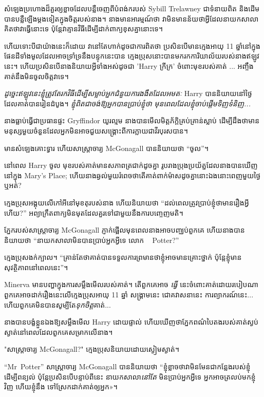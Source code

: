 សំឡេង​ប្រហោង​ដ៏​គួរ​ឲ្យ​ខ្លាច​ដែល​បន្លឺ​ចេញ​ពី​បំពង់ក​របស់ Sybill Trelawney ជា​ទំនាយ​ពិត និង​ដើម​បាន​បន្លឺ​ឡើង​ម្ដង​ទៀត​ក្នុង​ចិត្ត​របស់​នាង។ នាង​មាន​អារម្មណ៍​ថា វា​មិន​មាន​ន័យ​ថា​អ្វី​ដែល​នាយក​សាលា​គិត​ថា​វា​ធ្វើ​នោះ​ទេ ប៉ុន្តែ​វា​គ្មាន​វិធី​ដើម្បី​ដាក់​ពាក្យ​ខុស​គ្នា​នោះ​ទេ។

ហើយទោះបីជាយ៉ាងនេះក៏ដោយ វានៅតែហាក់ដូចជាការពិតថា ប្រសិនបើមានក្មេងអាយុ 11 ឆ្នាំនៅក្នុងផែនដីទាំងមូលដែលអាចទ្រាំទ្រនឹងបន្ទុកនេះបាន ក្មេងប្រុសនោះបានមករកការិយាល័យរបស់នាងឥឡូវនេះ។ ហើយប្រសិនបើនាងនិយាយអ្វីទាំងអស់ដូចជា 'Harry ក្រីក្រ' ចំពោះមុខរបស់គាត់ ... អញ្ចឹងគាត់នឹងមិនចូលចិត្តវាទេ។

\emph{ដូច្នេះឥឡូវនេះខ្ញុំត្រូវតែរកវិធីដើម្បីសម្លាប់អ្នកជំនួយការងងឹតដែលអមតៈ} Harry បាននិយាយនៅថ្ងៃដែលគាត់បានរៀនដំបូង។ \emph{ខ្ញុំពិតជាចង់ឱ្យអ្នកបានប្រាប់ខ្ញុំថា មុនពេលដែលខ្ញុំចាប់ផ្តើមទិញទំនិញ...}

នាងធ្លាប់ធ្វើជាប្រធានផ្ទះ Gryffindor យូរល្មម នាងបានមើលមិត្តភ័ក្តិគ្រប់គ្រាន់ស្លាប់ ដើម្បីដឹងថាមានមនុស្សមួយចំនួនដែលអ្នកមិនអាចជួយសង្គ្រោះពីការក្លាយជាវីរបុរសបាន។

មាន​សំឡេង​គោះ​ទ្វារ ហើយ​សាស្ត្រាចារ្យ McGonagall បាន​និយាយ​ថា “ចូល”។

នៅពេល Harry ចូល មុខរបស់គាត់មានសភាពត្រជាក់ដូចគ្នា រូបរាងប្រុងប្រយ័ត្នដែលនាងបានឃើញនៅក្នុង Mary's Place; ហើយ​នាង​ឆ្ងល់​មួយ​រំពេច​ថា​តើ​គាត់​ពាក់​ម៉ាស​ដូចគ្នា​នោះ​ឯង​នោះ​ពេញ​មួយ​ថ្ងៃ​ឬ​អត់?

ក្មេង​ប្រុស​អង្គុយ​លើ​កៅអី​នៅ​មុខ​តុ​របស់​នាង ហើយ​និយាយ​ថា “ដល់​ពេល​ត្រូវ​ប្រាប់​ខ្ញុំ​ថា​មាន​រឿង​អ្វី​ហើយ?” អព្យាក្រឹត​ពាក្យ​មិន​មុត​ដែល​គួរ​ទៅ​ជាមួយ​នឹង​ការ​បញ្ចេញ​មតិ។

ភ្នែក​របស់​សាស្ត្រាចារ្យ McGonagall ភ្ញាក់​ផ្អើល​មុន​ពេល​នាង​អាច​បញ្ឈប់​ពួក​គេ ហើយ​នាង​បាន​និយាយ​ថា “នាយក​សាលា​មិន​បាន​ប្រាប់​អ្នក​អ្វី​ទេ លោក ~ Potter?”

ក្មេងប្រុសងក់ក្បាល។ “គ្រាន់តែថាគាត់បានទទួលការព្រមានថាខ្ញុំអាចមានគ្រោះថ្នាក់ ប៉ុន្តែខ្ញុំមានសុវត្ថិភាពនៅពេលនេះ”។

Minerva មានបញ្ហាក្នុងការសម្លឹងមើលរបស់គាត់។ តើពួកគេអាច \emph{ធ្វើ} នេះចំពោះគាត់ដោយរបៀបណា ពួកគេអាចដាក់រឿងនេះលើក្មេងប្រុសអាយុ 11 ឆ្នាំ សង្គ្រាមនេះ ជោគវាសនានេះ ការព្យាករណ៍នេះ... ហើយពួកគេមិនបានសូម្បីតែ\emph{ទុកចិត្ត}គាត់...

នាងបានបង្ខំខ្លួនឯងឱ្យសម្លឹងមើល Harry ដោយផ្ទាល់ ហើយឃើញថាភ្នែកពណ៌បៃតងរបស់គាត់ស្ងប់ស្ងាត់នៅពេលដែលពួកគេសម្រាកលើនាង។

"សាស្រ្តាចារ្យ McGonagall?" ក្មេងប្រុសនិយាយដោយស្ងៀមស្ងាត់។

“Mr~Potter” សាស្ត្រាចារ្យ McGonagall បាននិយាយថា “ខ្ញុំខ្លាចថាវាមិនមែនជាកន្លែងរបស់ខ្ញុំដើម្បីពន្យល់ ប៉ុន្តែប្រសិនបើបន្ទាប់ពីនេះ នាយកសាលា\emph{នៅតែ} មិនប្រាប់អ្នកអ្វីទេ អ្នកអាចត្រលប់មកខ្ញុំវិញ ហើយខ្ញុំនឹង ទៅ​ស្រែក​ដាក់​គាត់​ឲ្យ​អ្នក»។


